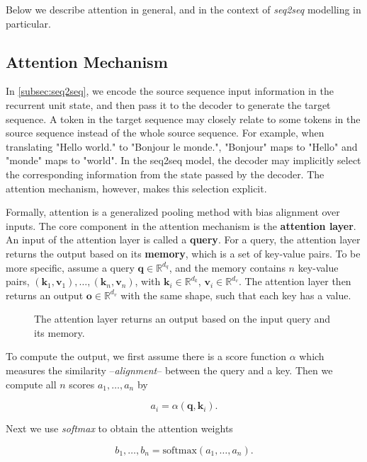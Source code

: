 Below we describe attention in general, and in the context of \textit{seq2seq} modelling in particular.

\subsection{Attention Mechanism}\label{sec:attention}

In \cref{subsec:seq2seq}, we encode the source sequence input information in the recurrent unit state, and then pass it to the decoder to generate the target sequence. A token in the target sequence may closely relate to some tokens in the source sequence instead of the whole source sequence. For example, when translating "Hello world." to "Bonjour le monde.", "Bonjour" maps to "Hello" and "monde" maps to "world". In the seq2seq model, the decoder may implicitly select the corresponding information from the state passed by the decoder. The attention mechanism, however, makes this selection explicit.

Formally, attention is a generalized pooling method with bias alignment over inputs. The core component in the attention mechanism is the \textbf{attention layer}. An input of the attention layer is called a \textbf{query}. For a query, the attention layer returns the output based on its \textbf{memory}, which is a set of key-value pairs. To be more specific, assume a query $\mathbf{q}\in\mathbb R^{d_q}$, and the memory contains $n$ key-value pairs, $(\mathbf{k}_1, \mathbf{v}_1), \ldots, (\mathbf{k}_n, \mathbf{v}_n)$, with $\mathbf{k}_i\in\mathbb R^{d_k}$, $\mathbf{v}_i\in\mathbb R^{d_v}$. The attention layer then returns an output $\mathbf o\in\mathbb R^{d_v}$ with the same shape, such that each key has a value.

\begin{figure}[hpt]
	\centering
	
	\caption{The attention layer returns an output based on the input query and its memory.}
	\label{fig:attention}
\end{figure}

To compute the output, we first assume there is a score function $\alpha$ which measures the similarity --\textit{alignment}-- between the query and a key. Then we compute all $n$ scores $a_1, \ldots, a_n$ by

$$a_i = \alpha(\mathbf q, \mathbf k_i).$$

Next we use \textit{softmax} to obtain the attention weights

$$b_1, \ldots, b_n = \textrm{softmax}(a_1, \ldots, a_n).$$


